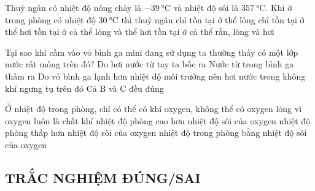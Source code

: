 \begin{ex}
Thuỷ ngân có nhiệt độ nóng chảy là $\SI{-39}{\celsius}$ và nhiệt độ sôi là $\SI{357}{\celsius}$. Khi ở trong phòng có nhiệt độ $\SI{30}{\celsius}$ thì thuỷ ngân
\choice
{\True chỉ tồn tại ở thể lỏng}
{ chỉ tồn tại ở thể hơi}
{ tồn tại ở cả thể lỏng và thể hơi}
{ tồn tại ở cả thể rắn, lỏng và hơi}
\end{ex}
\begin{ex}
Tại sao khi cầm vào vỏ bình ga mini đang sử dụng ta thường thấy có một lớp nước rất
mỏng trên đó?
\choice
{ Do hơi nước từ tay ta bốc ra}
{ Nước từ trong bình ga thấm ra}
{\True Do vỏ bình ga lạnh hơn nhiệt độ môi trường nên hơi nước trong không khí ngưng tụ trên đó}
{ Cả B và C đều đúng}
\end{ex}
\begin{ex}
Ở nhiệt độ trong phòng, chỉ có thể có khí oxygen, không thể có oxygen lỏng vì
\choice
{ oxygen luôn là chất khí}
{\True nhiệt độ phòng cao hơn nhiệt độ sôi của oxygen}
{ nhiệt độ phòng thấp hơn nhiệt độ sôi của oxygen}
{ nhiệt độ trong phòng bằng nhiệt độ sôi của oxygen}
\loigiai{ }
\end{ex}


\subsection{TRẮC NGHIỆM ĐÚNG/SAI}

